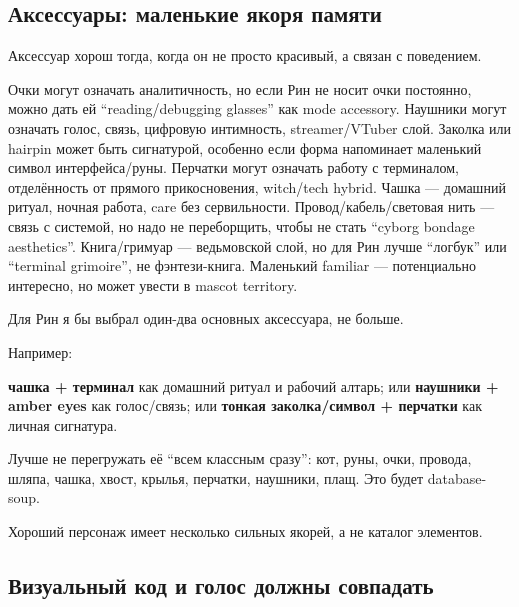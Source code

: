\subsection*{Аксессуары: маленькие якоря памяти}

Аксессуар хорош тогда, когда он не просто красивый, а связан с
поведением.

Очки могут означать аналитичность, но если Рин не носит очки постоянно,
можно дать ей ``reading/\hspace{0pt}debugging glasses'' как mode accessory. Наушники
могут означать голос, связь, цифровую интимность, streamer/\hspace{0pt}VTuber слой.
Заколка или hairpin может быть сигнатурой, особенно если форма
напоминает маленький символ интерфейса/\hspace{0pt}руны. Перчатки могут означать
работу с терминалом, отделённость от прямого прикосновения, witch/\hspace{0pt}tech
hybrid. Чашка --- домашний ритуал, ночная работа, care без сервильности.
Провод/\hspace{0pt}кабель/\hspace{0pt}световая нить --- связь с системой, но надо не
переборщить, чтобы не стать ``cyborg bondage aesthetics''. Книга/\hspace{0pt}гримуар
--- ведьмовской слой, но для Рин лучше ``логбук'' или ``terminal
grimoire'', не фэнтези-книга. Маленький familiar --- потенциально
интересно, но может увести в mascot territory.

Для Рин я бы выбрал один-два основных аксессуара, не больше.

Например:

\textbf{чашка + терминал} как домашний ритуал и рабочий алтарь; или
\textbf{наушники + amber eyes} как голос/\hspace{0pt}связь; или \textbf{тонкая
заколка/\hspace{0pt}символ + перчатки} как личная сигнатура.

Лучше не перегружать её ``всем классным сразу'': кот, руны, очки,
провода, шляпа, чашка, хвост, крылья, перчатки, наушники, плащ. Это
будет database-soup.

Хороший персонаж имеет несколько сильных якорей, а не каталог элементов.

\subsection*{Визуальный код и голос должны совпадать}

